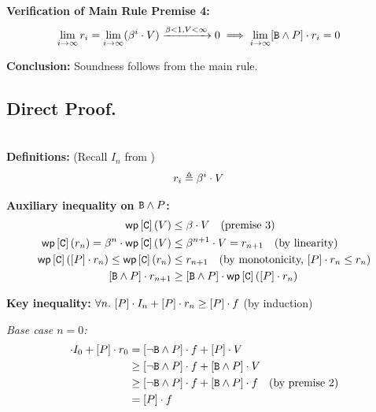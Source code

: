 \noindent\textbf{Verification of Main Rule Premise 4:}
\begin{align*}
  \lim_{i \to \infty} r_i = \lim_{i \to \infty} (\beta^i \cdot V) \xrightarrow{\beta < 1, V < \infty} 0
    &\implies \lim_{i \to \infty} [\mathtt{B} \wedge P] \cdot r_i = 0
\end{align*}

\noindent\textbf{Conclusion:} Soundness follows from the main rule.
\\
\subsection{Direct Proof.}~\\
\noindent\textbf{Definitions:} (Recall $I_n$ from )
\begin{align*}
  r_i &\triangleq \beta^i \cdot V
\end{align*}

\noindent\textbf{Auxiliary inequality on $\mathtt{B} \wedge P$:}
\begin{align*}
  \WP{\cmd}{V} &\leq \beta \cdot V \quad \text{(premise 3)} \\
  \WP{\cmd}{r_n} = \beta^n \cdot \WP{\cmd}{V} &\leq \beta^{n+1} \cdot V = r_{n+1} \quad \text{(by linearity)} \\
  \WP{\cmd}{[\pred] \cdot r_n} \leq \WP{\cmd}{r_n} &\leq r_{n+1} \quad \text{(by monotonicity, } [\pred] \cdot r_n \leq r_n\text{)} \\
  [\bexpr \wedge \pred] \cdot r_{n+1} &\geq [\bexpr \wedge \pred] \cdot \WP{\cmd}{[\pred] \cdot r_n}
\end{align*}

\noindent\textbf{Key inequality:} $\forall n.\ [P] \cdot I_n + [P] \cdot r_n \geq [P] \cdot f$ (by induction)

\noindent\textit{Base case $n = 0$:}
\begin{align*}
  [\pred] \cdot I_0 + [\pred] \cdot r_0
    &= [\neg\bexpr \wedge \pred] \cdot \ex + [\pred] \cdot V \\
    &\geq [\neg\bexpr \wedge \pred] \cdot \ex + [\bexpr \wedge \pred] \cdot V \\
    &\geq [\neg\bexpr \wedge \pred] \cdot \ex + [\bexpr \wedge \pred] \cdot \ex \quad \text{(by premise 2)} \\
    &= [\pred] \cdot \ex
\end{align*}

